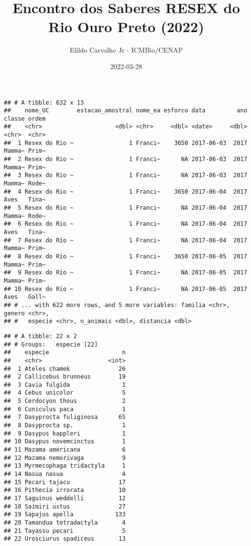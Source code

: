 \documentclass[]{tufte-handout}
\title[Análise mamíferos terrestres -- 2017 a 2021]{Encontro dos Saberes
RESEX do Rio Ouro Preto (2022)}
\author{Elildo Carvalho Jr - ICMBio/CENAP}
\date{2022-03-28}
\begin{document}
\maketitle




\begin{verbatim}
## # A tibble: 632 x 13
##    nome_UC        estacao_amostral nome_ea esforco data         ano classe ordem
##    <chr>                     <dbl> <chr>     <dbl> <date>     <dbl> <chr>  <chr>
##  1 Resex do Rio ~                1 Franci~    3650 2017-06-03  2017 Mamma~ Prim~
##  2 Resex do Rio ~                1 Franci~      NA 2017-06-03  2017 Mamma~ Prim~
##  3 Resex do Rio ~                1 Franci~      NA 2017-06-03  2017 Mamma~ Rode~
##  4 Resex do Rio ~                1 Franci~    3650 2017-06-04  2017 Aves   Tina~
##  5 Resex do Rio ~                1 Franci~      NA 2017-06-04  2017 Mamma~ Rode~
##  6 Resex do Rio ~                1 Franci~      NA 2017-06-04  2017 Aves   Tina~
##  7 Resex do Rio ~                1 Franci~      NA 2017-06-04  2017 Mamma~ Prim~
##  8 Resex do Rio ~                1 Franci~    3650 2017-06-05  2017 Mamma~ Prim~
##  9 Resex do Rio ~                1 Franci~      NA 2017-06-05  2017 Mamma~ Prim~
## 10 Resex do Rio ~                1 Franci~      NA 2017-06-05  2017 Aves   Gall~
## # ... with 622 more rows, and 5 more variables: familia <chr>, genero <chr>,
## #   especie <chr>, n_animais <dbl>, distancia <dbl>
\end{verbatim}

\begin{verbatim}
## # A tibble: 22 x 2
## # Groups:   especie [22]
##    especie                     n
##    <chr>                   <int>
##  1 Ateles chamek              26
##  2 Callicebus brunneus        19
##  3 Cavia fulgida               1
##  4 Cebus unicolor              5
##  5 Cerdocyon thous             2
##  6 Cuniculus paca              1
##  7 Dasyprocta fuliginosa      65
##  8 Dasyprocta sp.              1
##  9 Dasypus kappleri            1
## 10 Dasypus novemcinctus        1
## 11 Mazama americana            6
## 12 Mazama nemorivaga           9
## 13 Myrmecophaga tridactyla     1
## 14 Nasua nasua                 4
## 15 Pecari tajacu              17
## 16 Pithecia irrorata          10
## 17 Saguinus weddelli          12
## 18 Saimiri ustus              27
## 19 Sapajus apella            133
## 20 Tamandua tetradactyla       4
## 21 Tayassu pecari              5
## 22 Urosciurus spadiceus       13
\end{verbatim}
\end{document}
